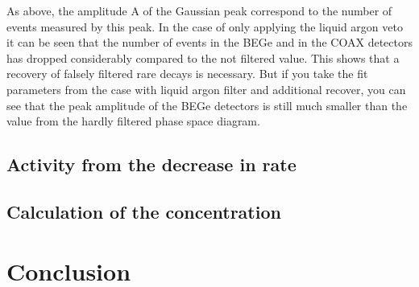 As above, the amplitude A of the Gaussian peak correspond to the number of events measured by this peak.
In the case of only applying the liquid argon veto it can be seen that the number of events in the BEGe and in the COAX detectors has dropped considerably compared to the not filtered value.
This shows that a recovery of falsely filtered rare  decays is necessary.
But if you take the fit parameters from the case with liquid argon filter and additional recover, you can see that the peak amplitude of the BEGe detectors is still much smaller than the value from the hardly filtered phase space diagram.
\\





\subsection{Activity from the decrease in rate}
\label{sec:SAfromDecrease}



\subsection{Calculation of the concentration}
\label{sec:calcOfTheCon}


\section{Conclusion}


































